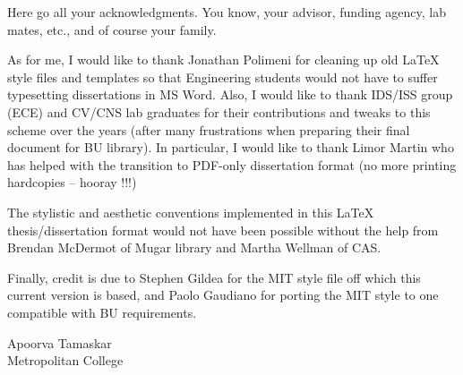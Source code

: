 Here go all your acknowledgments. You know, your advisor, funding agency, lab
mates, etc., and of course your family.

As for me, I would like to thank Jonathan Polimeni for cleaning up old LaTeX
style files and templates so that Engineering students would not have to suffer
typesetting dissertations in MS Word. Also, I would like to thank IDS/ISS
group (ECE) and CV/CNS lab graduates for their contributions and tweaks to this
scheme over the years (after many frustrations when preparing their final
document for BU library). In particular, I would like to thank Limor Martin who
has helped with the transition to PDF-only dissertation format (no more printing
hardcopies -- hooray !!!)

The stylistic and aesthetic conventions implemented in this LaTeX
thesis/dissertation format would not have been possible without the help from
Brendan McDermot of Mugar library and Martha Wellman of CAS.

Finally, credit is due to Stephen Gildea for the MIT style file off which this
current version is based, and Paolo Gaudiano for porting the MIT style to one
compatible with BU requirements.

\vskip 1in

\noindent
Apoorva Tamaskar\\
Metropolitan College
